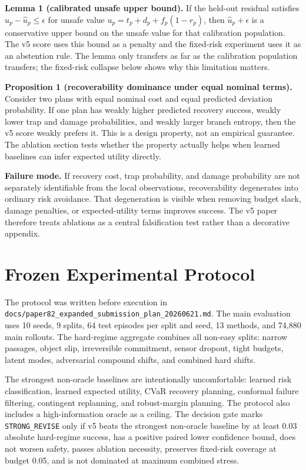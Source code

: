 \documentclass{article}
\begin{document}
\textbf{Lemma 1 (calibrated unsafe upper bound).} If the held-out residual satisfies $u_p-\hat u_p \leq \epsilon$ for unsafe value $u_p=t_p+d_p+f_p(1-r_p)$, then $\hat u_p+\epsilon$ is a conservative upper bound on the unsafe value for that calibration population. The v5 score uses this bound as a penalty and the fixed-risk experiment uses it as an abstention rule. The lemma only transfers as far as the calibration population transfers; the fixed-risk collapse below shows why this limitation matters.

\textbf{Proposition 1 (recoverability dominance under equal nominal terms).} Consider two plans with equal nominal cost and equal predicted deviation probability. If one plan has weakly higher predicted recovery success, weakly lower trap and damage probabilities, and weakly larger branch entropy, then the v5 score weakly prefers it. This is a design property, not an empirical guarantee. The ablation section tests whether the property actually helps when learned baselines can infer expected utility directly.

\textbf{Failure mode.} If recovery cost, trap probability, and damage probability are not separately identifiable from the local observations, recoverability degenerates into ordinary risk avoidance. That degeneration is visible when removing budget slack, damage penalties, or expected-utility terms improves success. The v5 paper therefore treats ablations as a central falsification test rather than a decorative appendix.

\section{Frozen Experimental Protocol}

The protocol was written before execution in \texttt{docs/paper82\_expanded\_submission\_plan\_20260621.md}. The main evaluation uses 10 seeds, 9 splits, 64 test episodes per split and seed, 13 methods, and 74,880 main rollouts. The hard-regime aggregate combines all non-easy splits: narrow passages, object slip, irreversible commitment, sensor dropout, tight budgets, latent modes, adversarial compound shifts, and combined hard shifts.

The strongest non-oracle baselines are intentionally uncomfortable: learned risk classification, learned expected utility, CVaR recovery planning, conformal failure filtering, contingent replanning, and robust-margin planning. The protocol also includes a high-information oracle as a ceiling. The decision gate marks \texttt{STRONG\_REVISE} only if v5 beats the strongest non-oracle baseline by at least 0.03 absolute hard-regime success, has a positive paired lower confidence bound, does not worsen safety, passes ablation necessity, preserves fixed-risk coverage at budget 0.05, and is not dominated at maximum combined stress.
\end{document}
